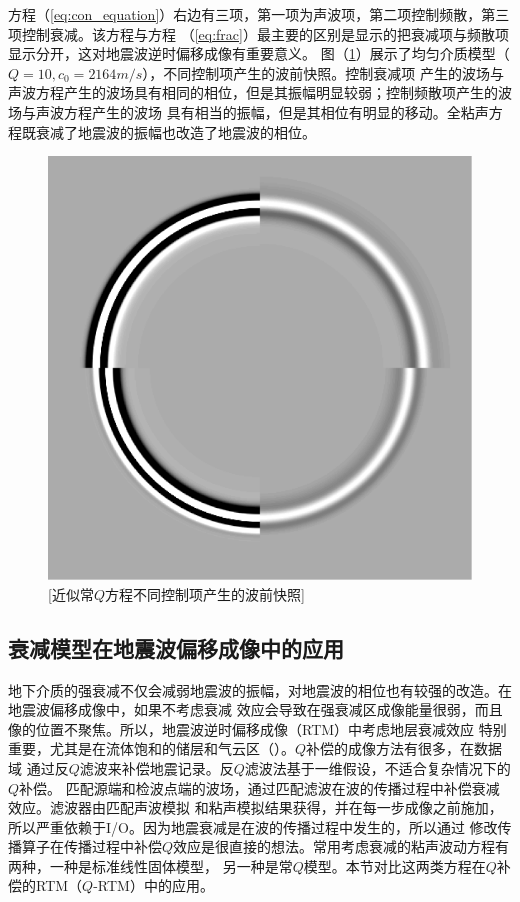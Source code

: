 方程（\ref{eq:con_equation}）右边有三项，第一项为声波项，第二项控制频散，第三项控制衰减。该方程与方程
（\ref{eq:frac}）最主要的区别是显示的把衰减项与频散项显示分开，这对地震波逆时偏移成像有重要意义。
图（\ref{fig:wave_frac}）展示了均匀介质模型（$Q=10,c_0=2164m/s$），不同控制项产生的波前快照。控制衰减项
产生的波场与声波方程产生的波场具有相同的相位，但是其振幅明显较弱；控制频散项产生的波场与声波方程产生的波场
具有相当的振幅，但是其相位有明显的移动。全粘声方程既衰减了地震波的振幅也改造了地震波的相位。
\begin{figure}[!htbp]
	    \centering
		\includegraphics[width=0.5\linewidth]{figure/wave_frac}
		[近似常$Q$方程不同控制项产生的波前快照]
		\label{fig:wave_frac}
\end{figure}


\vspace{0.5cm}
\subsection{衰减模型在地震波偏移成像中的应用}
地下介质的强衰减不仅会减弱地震波的振幅，对地震波的相位也有较强的改造。在地震波偏移成像中，如果不考虑衰减
效应会导致在强衰减区成像能量很弱，而且像的位置不聚焦。所以，地震波逆时偏移成像（RTM）中考虑地层衰减效应
特别重要，尤其是在流体饱和的储层和气云区（）。$Q$补偿的成像方法有很多，在数据域
通过反$Q$滤波来补偿地震记录。反$Q$滤波法基于一维假设，不适合复杂情况下的$Q$补偿。
匹配源端和检波点端的波场，通过匹配滤波在波的传播过程中补偿衰减效应。滤波器由匹配声波模拟
和粘声模拟结果获得，并在每一步成像之前施加，所以严重依赖于I/O。因为地震衰减是在波的传播过程中发生的，所以通过
修改传播算子在传播过程中补偿$Q$效应是很直接的想法。常用考虑衰减的粘声波动方程有两种，一种是标准线性固体模型，
另一种是常$Q$模型。本节对比这两类方程在$Q$补偿的RTM（$Q$-RTM）中的应用。

